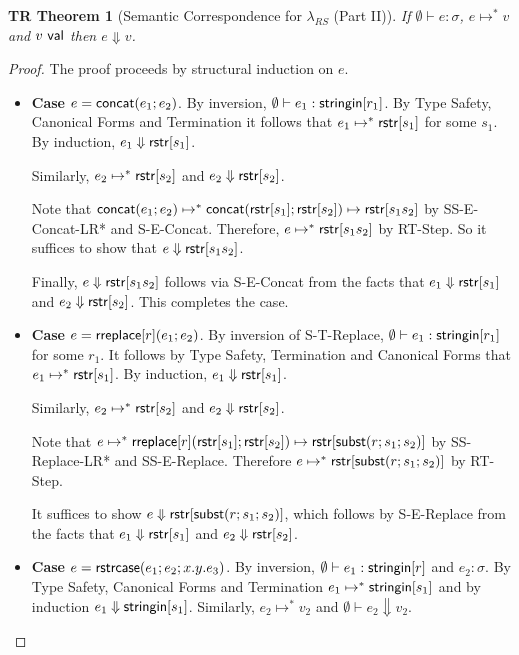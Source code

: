 \documentclass[12pt]{article}
\newtheorem{trthm}[tr]{TR Theorem}
\theoremstyle{definition}
\newcommand{\lambdas}{\lambda_{RS}}
\newcommand{\val}{{\sf val}}
\newcommand{\stringin}[1]{{\sf stringin}[#1]}
\newcommand{\lsubst}[3]{{\sf subst}(#1;#2;#3)} %
\newcommand{\strcase}[3]{ {\sf rstrcase}(#1; #2; #3)}
\newcommand{\sreduces}{ \Downarrow }
\begin{document}
\begin{trthm}[Semantic Correspondence for $\lambdas$ (Part II)]
If $\emptyset\vdash e : \sigma$, $e \mapsto^* v$ and $v \ \val$ then $e \sreduces v$.  
\end{trthm}
\begin{proof}
The proof proceeds by structural induction on $e$.

\begin{itemize}[label=$ $,itemsep=1ex]

\item \textbf{Case $e = {\sf concat}(e_1;e_2)$}.
By inversion, $\emptyset\vdash e_1 : \stringin{r_1}$.
By Type Safety, Canonical Forms and Termination it follows that $e_1 \mapsto^* {\sf rstr}[s_1]$ for some $s_1$.
By induction, $e_1 \sreduces \rstr{s_1}$.

Similarly, $e_2 \mapsto^* {\sf rstr}[s_2]$ and $e_2 \sreduces \rstr{s_2}$.

Note that ${\sf concat}(e_1;e_2) \mapsto^* {\sf concat}({\sf rstr}[s_1];{\sf rstr}[s_2]) \mapsto {\sf rstr}[s_1s_2]$ by SS-E-Concat-LR* and S-E-Concat.
Therefore, $e \mapsto^* {\sf rstr}[s_1s_2]$ by RT-Step. So it suffices to show that $e \sreduces \rstr{s_1s_2}$.

Finally, $e \sreduces \rstr{s_1s_2}$ follows via S-E-Concat from the facts that $e_1 \sreduces \rstr{s_1}$ and $e_2 \sreduces \rstr{s_2}$.
This completes the case. 

\item \textbf{Case $e = {\sf rreplace}[r](e_1;e_2)$}.
By inversion of S-T-Replace, $\emptyset\vdash e_1 : \stringin{r_1}$ for some $r_1$.
It follows by Type Safety, Termination and Canonical Forms that $e_1 \mapsto^* {\sf rstr}[s_1]$.
By induction, $e_1 \sreduces \rstr{s_1}$.

Similarly, $e_2 \mapsto^* {\sf rstr}[s_2]$ and $e_2 \sreduces \rstr{s_2}$.

Note that $e \mapsto^* \rreplace{r}{\rstr{s_1}}{\rstr{s_2}} \mapsto \rstr{\lsubst{r}{s_1}{s_2}}$ by SS-Replace-LR* and SS-E-Replace.
Therefore $e \mapsto^* \rstr{\lsubst{r}{s_1}{s_2}}$ by RT-Step. 

It suffices to show $e \sreduces \rstr{\lsubst{r}{s_1}{s_2}}$, which follows by S-E-Replace from the facts that $e_1 \sreduces \rstr{s_1}$ and
$e_2 \sreduces \rstr{s_2}$.


\item \textbf{Case $e = \strcase{e_1}{e_2}{x.y.e_3}$}.
By inversion, $\emptyset\vdash e_1 : \stringin{r}$ and $e_2 : \sigma$.
By Type Safety, Canonical Forms and Termination $e_1 \mapsto^* \stringin{s_1}$ and by induction $e_1 \sreduces \stringin{s_1}$.
Similarly, $e_2 \mapsto^* v_2$ and $\emptyset\vdash e_2 \sreduces v_2$.


\end{itemize}
\end{proof}
\end{document}
